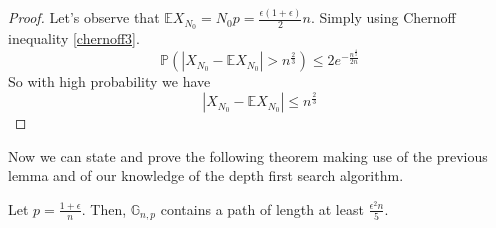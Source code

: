 \begin{proof}
	Let's observe that $\mathbb{E}X_{N_0} = N_0 p = \frac{\epsilon(1+\epsilon)}{2}n$.
	Simply using Chernoff inequality \eqref{chernoff3}.
	\begin{equation}
		\mathbb{P}(|X_{N_0} - \mathbb{E}X_{N_0}| > n^{\frac{2}{3}} ) \leq 2 e^{-\frac{n^{\frac{4}{3}}}{2n}}
	\end{equation}
	So with high probability we have 
	\begin{equation}
		|X_{N_0} - \mathbb{E}X_{N_0}| \leq n^{\frac{2}{3}}
	\end{equation}
\end{proof}
Now we can state and prove the following theorem making use of the previous lemma and of our knowledge of the depth first search algorithm.
\begin{theorem}
	Let $p = \frac{1+\epsilon}{n}$. Then, $\mathbb{G}_{n,p}$ contains a path of length at least $\frac{\epsilon^2n}{5}$.
\end{theorem}
